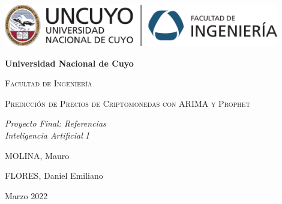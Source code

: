 \documentclass[a4paper,10pt]{article}
\begin{document}
\begin{titlepage}
\centering
{\includegraphics[width=0.9\textwidth]{fing_uncuyo}\par}
\vspace{1cm}
{\bfseries\LARGE Universidad Nacional de Cuyo \par}
\vspace{1cm}
{\scshape\Large Facultad de Ingeniería \par}
\vspace{3cm}
{\scshape\Huge Predicción de Precios de Criptomonedas con ARIMA y Prophet \par}
\vspace{3cm}
{\itshape\Large Proyecto Final: Referencias\\Inteligencia Artificial I \par}
\vfill
{\Large MOLINA, Mauro \par}
{\Large FLORES, Daniel Emiliano \par}
\vfill
{\Large Marzo 2022 \par}
\end{titlepage}

\newpage
\end{document}
